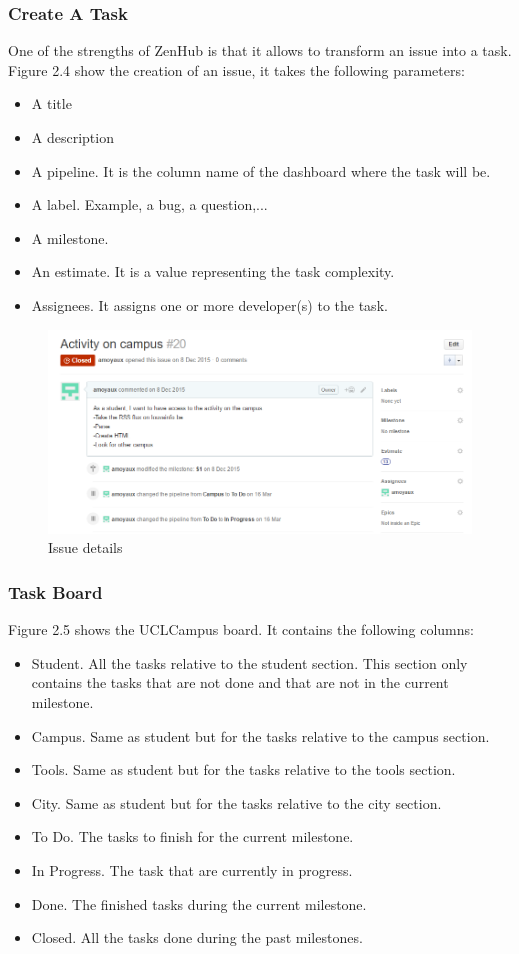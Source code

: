 \documentclass{eplmastersthesis}
\begin{document}
\subsubsection{Create A Task}
One of the strengths of ZenHub is that it allows to transform an issue into a task. Figure 2.4 show the creation of an issue, it takes the following parameters:
\begin{itemize}
\item A title
\item A description
\item A pipeline. It is the column name of the dashboard where the task will be.
\item A label. Example, a bug, a question,...
\item A milestone.
\item An estimate. It is a value representing the task complexity.
\item Assignees. It assigns one or more developer(s) to the task.
\end{itemize}

\begin{figure}[H]
\centering
\includegraphics[scale = .65]{Images/issue.png}
\caption{Issue details}
\end{figure}

\subsubsection{Task Board}
Figure 2.5 shows the UCLCampus board. It contains the following columns:
\begin{itemize}
\item Student. All the tasks relative to the student section. This section only contains the tasks that are not done and that are not in the current milestone.
\item Campus. Same as student but for the tasks relative to the campus section.
\item Tools. Same as student but for the tasks relative to the tools section.
\item City. Same as student but for the tasks relative to the city section.
\item To Do. The tasks to finish for the current milestone.
\item In Progress. The task that are currently in progress.
\item Done. The finished tasks during the current milestone.
\item Closed. All the tasks done during the past milestones.
\end{itemize}
\end{document}
